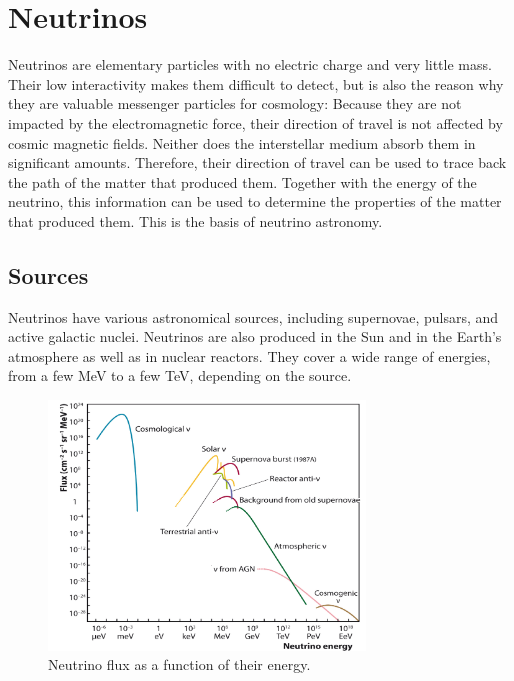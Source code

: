 \section{Neutrinos}

Neutrinos are elementary particles with no electric charge and very little mass.
Their low interactivity
  makes them difficult to detect,
  but is also the reason why they are valuable messenger particles for cosmology:
Because they are not impacted by the electromagnetic force,
  their direction of travel is not affected by cosmic magnetic fields.
Neither does the interstellar medium absorb them in significant amounts.
Therefore,
  their direction of travel can be used to trace back the path of the matter that produced them.
Together with the energy of the neutrino,
  this information can be used to determine the properties of the matter that produced them.
This is the basis of neutrino astronomy.


\subsection{Sources}
Neutrinos have various astronomical sources,
including
  supernovae,
  pulsars, %
  and active galactic nuclei.
Neutrinos are also produced in
  the Sun
  and in the Earth's atmosphere
  as well as in nuclear reactors.
They cover a wide range of energies, from a few MeV to a few TeV,
  depending on the source.

\begin{figure}
  \centering
  \includegraphics[width=0.75\textwidth]{content/plots/halftime/neutrinos-energy.png}
  \caption{Neutrino flux as a function of their energy.}
  \label{fig:neutrinos:flux_spectrum}
\end{figure}


